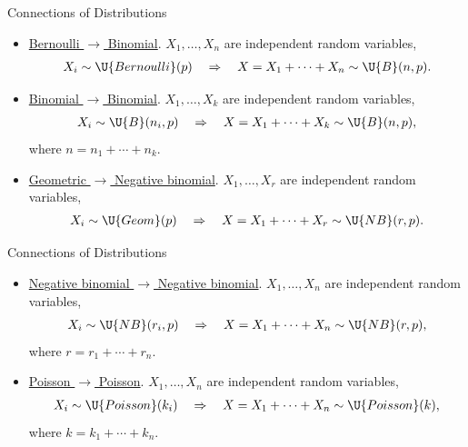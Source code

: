 \begin{frame}{Connections of Distributions}

\begin{itemize}
	\justifying
	\item \underline{Bernoulli $\rightarrow$ Binomial}. $X_1, \ldots, X_n$ are independent random variables,
	\begin{align*}
	X_i\sim \U{Bernoulli}(p) \quad \Rightarrow \quad X = X_1 + \cdots + X_n \sim \U{B}(n, p).
	\end{align*}
	\item \underline{Binomial $\rightarrow$ Binomial}. $X_1, \ldots, X_k$ are independent random variables,
	\begin{align*}
	X_i\sim \U{B}(n_i, p) \quad \Rightarrow\quad X = X_1 + \cdots + X_k \sim \U{B}(n, p),
	\end{align*}
	where $n = n_1 + \cdots + n_k$.
	\item \underline{Geometric $\rightarrow$ Negative binomial}. $X_1, \ldots, X_r$ are independent random variables,
	\begin{align*}
	X_i\sim \U{Geom}(p) \quad \Rightarrow \quad X = X_1 + \cdots + X_r \sim \U{NB}(r, p).
	\end{align*}
\end{itemize}

\end{frame}


\begin{frame}{Connections of Distributions}

\begin{itemize}
	\justifying
	\item \underline{Negative binomial $\rightarrow$ Negative binomial}. $X_1, \ldots, X_n$ are independent random variables,
	\begin{align*}
	X_i\sim \U{NB}(r_i, p) \quad \Rightarrow \quad X = X_1 + \cdots + X_n \sim \U{NB}(r, p),
	\end{align*}
	where $r = r_1 + \cdots + r_n$.
	\item \underline{Poisson $\rightarrow$ Poisson}. $X_1, \ldots, X_n$ are independent random variables,
	\begin{align*}
	X_i\sim \U{Poisson}(k_i) \quad \Rightarrow \quad X = X_1 + \cdots + X_n \sim \U{Poisson}(k),
	\end{align*}
	where $k = k_1 + \cdots + k_n$.
\end{itemize}

\end{frame}


